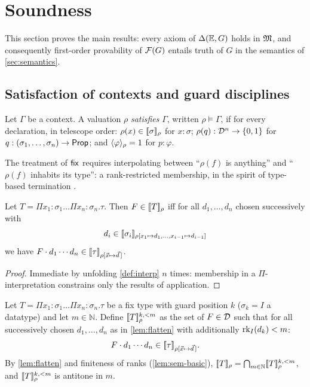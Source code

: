 \section{Soundness}
\label{sec:soundness}

This section proves the main results: every axiom of $\Delta(\mathbb{E},G)$ holds in
$\mathfrak{M}$, and consequently first-order provability of $\mathcal{F}(G)$ entails truth
of $G$ in the semantics of \cref{sec:semantics}.

\subsection{Satisfaction of contexts and guard disciplines}

\begin{definition}
\label{def:ctx-sat}
Let $\Gamma$ be a context.  A valuation $\rho$ \emph{satisfies} $\Gamma$,
written $\rho \vDash \Gamma$, if for every declaration, in telescope
order: $\rho(x) \in [\![ \sigma ]\!]_{\rho}$ for $x : \sigma$; $\rho(q) :
\mathcal{D}^n \to \{0,1\}$ for $q : (\sigma_1, \dots, \sigma_n) \to \mathsf{Prop}$; and
$\langle \varphi \rangle_{\rho} = 1$ for $p : \varphi$.
\end{definition}

The treatment of $\mathsf{fix}$ requires interpolating between ``$\rho(f)$ is
anything'' and ``$\rho(f)$ inhabits its type'': a rank-restricted
membership, in the spirit of type-based termination
\cite{BartheEtAl2004,Gimenez1995}.

\begin{lemma}
\label{lem:flatten}
Let $T = \Pi x_1{:}\sigma_1 \dots \Pi x_n{:}\sigma_n.\tau$.  Then $F \in
[\![ T ]\!]_{\rho}$ iff for all $d_1, \dots, d_n$ chosen successively with
\[
  d_i \in [\![ \sigma_i ]\!]_{\rho[x_1 \mapsto d_1, \dots, x_{i-1} \mapsto
  d_{i-1}]}
\]
we have $F \cdot d_1 \cdots d_n \in [\![ \tau ]\!]_{\rho[\vec{x}
\mapsto \vec{d}\,]}$.
\end{lemma}

\begin{proof}
Immediate by unfolding \cref{def:interp} $n$ times: membership in a
$\Pi$-interpretation constrains only the results of application.
\end{proof}

\begin{definition}
\label{def:rank-restricted}
Let $T = \Pi x_1{:}\sigma_1 \dots \Pi x_n{:}\sigma_n.\tau$ be a fix type
with guard position $k$ ($\sigma_k = I$ a datatype) and let $m \in
\mathbb{N}$.  Define $[\![ T ]\!]_{\rho}^{k, <m}$ as the set of $F \in \mathcal{D}$
such that for all successively chosen $d_1, \dots, d_n$ as in
\cref{lem:flatten} with additionally $\mathrm{rk}_{I}(d_k) < m$:
\[
  F \cdot d_1 \cdots d_n \in [\![ \tau ]\!]_{\rho[\vec{x} \mapsto
  \vec{d}\,]}.
\]
By \cref{lem:flatten} and finiteness of ranks (\cref{lem:sem-basic}),
$[\![ T ]\!]_{\rho} = \bigcap_{m \in \mathbb{N}} [\![ T ]\!]_{\rho}^{k,<m}$, and
$[\![ T ]\!]_{\rho}^{k,<m}$ is antitone in $m$.
\end{definition}

